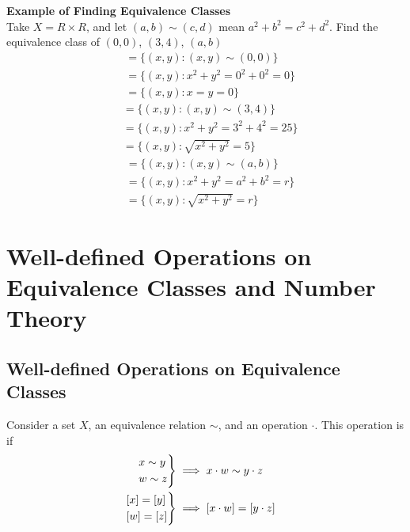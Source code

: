 \documentclass[openany]{report}
\begin{document}
\noindent
\textbf{Example of Finding Equivalence Classes}\\
Take $X = R \times R$, and let $(a,b) \sim (c,d)$ mean $a^2 + b^2 = c^2 + d^2$. Find the equivalence class of $(0,0)$, $(3,4)$, $(a,b)$
 \begin{align*}
        [(0,0)] &= \{(x,y) : (x,y) \sim (0,0)\}\\
        &= \{(x,y) : x^2 + y^2 = 0^2 + 0^2 = 0\}\\
        &= \{(x,y) : x = y = 0\}
\end{align*}
\begin{align*}
            [(3,4)] &= \{(x,y) : (x,y) \sim (3,4)\}\\
        &= \{(x,y) : x^2 + y^2 = 3^2 + 4^2 = 25\}\\
        &= \{(x,y) : \sqrt{x^2+y^2} = 5\}
\end{align*}
\begin{align*}
        [(a,b)] &= \{(x,y) : (x,y) \sim (a,b)\}\\
        &= \{(x,y) : x^2 + y^2 = a^2 + b^2 = r\}\\
        &= \{(x,y) : \sqrt{x^2+y^2} = r\}
\end{align*}
        
\chapter{Well-defined Operations on Equivalence Classes and Number Theory}
\section{Well-defined Operations on Equivalence Classes}
Consider a set $X$, an equivalence relation $\sim$, and an operation $\cdot$. This operation is  if \\

\begin{align*}
\begin{rcases}
 x \sim y\\
 w \sim z
\end{rcases}
&\implies x \cdot w \sim y \cdot z\\
\begin{rcases}
 [x] = [y]\\
 [w] = [z]
\end{rcases}
&\implies [x \cdot w] = [y \cdot z]
\end{align*}
\end{document}
